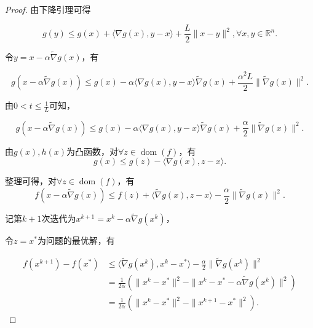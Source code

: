 \begin{proof}
    由下降引理可得

    \begin{equation*}
        g(y) \leq g(x) + \langle \nabla g(x), y-x \rangle + \frac{L}{2}\|x-y\|^{2}, \forall x, y \in \mathbb{R}^{n}.
    \end{equation*}

    令$y=x-\alpha\tilde{\nabla} g(x)$，有

    \begin{equation*}
        g(x-\alpha\tilde{\nabla} g(x)) \leq g(x) - \alpha \langle \nabla g(x), y-x \rangle \tilde{\nabla} g(x) + \frac{\alpha^{2}L}{2}\|\tilde{\nabla} g(x)\|^{2}.
    \end{equation*}

    由$0<t\leq \frac{1}{L}$可知，

    \begin{equation*}
        g(x-\alpha\tilde{\nabla} g(x)) \leq g(x) - \alpha \langle \nabla g(x), y-x \rangle \tilde{\nabla} g(x) + \frac{\alpha}{2}\|\tilde{\nabla} g(x)\|^{2}.
    \end{equation*}

    由$g(x), h(x)$为凸函数，对$\forall z \in \mathop{\mathrm{dom}} (f)$，有
    \begin{equation*}
        g(x) \leq g(z) - \langle \nabla g(x), z-x  \rangle.
    \end{equation*}

    整理可得，对$\forall z \in \mathop{\mathrm{dom}} (f)$，有
    \begin{equation*}
        f(x-\alpha\tilde{\nabla} g(x)) \leq f(z) + \langle \tilde{\nabla}g(x), z-x \rangle - \frac{\alpha}{2}\|\tilde{\nabla} g(x)\|^{2}.
    \end{equation*}

    记第$k+1$次迭代为$x^{k+1}=x^{k}-\alpha\tilde{\nabla}g(x^{k})$，
    
    令$z=x^{*}$为问题的最优解，有

    \begin{equation}
        \begin{split}
            f(x^{k+1})-f(x^{*}) &\leq \langle \tilde{\nabla}g(x^{k}), x^{k}-x^{*} \rangle - \frac{\alpha}{2}\|\tilde{\nabla}g(x^{k})\|^{2} \\
            &=\frac{1}{2\alpha}(\|x^{k}-x^{*}\|^{2} - \|x^{k}-x^{*}-\alpha\tilde{\nabla}g(x^{k})\|^{2}) \\
            &=\frac{1}{2\alpha}(\|x^{k}-x^{*}\|^{2} - \|x^{k+1}-x^{*}\|^{2}).
        \end{split}
    \end{equation}


\end{proof}
